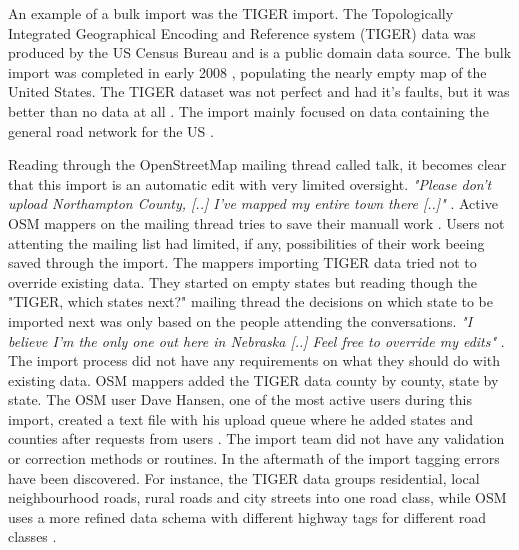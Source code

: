An example of a bulk import was the TIGER import. The Topologically Integrated Geographical Encoding and Reference system (TIGER) data was produced by the US Census Bureau and is a public domain data source. The bulk import was completed in early 2008 \cite{Zielstra2013}, populating the nearly empty map of the United States. The TIGER dataset was not perfect and had it's faults, but it was better than no data at all \cite{Willis2008}. The import mainly focused on data containing the general road network for the US \cite{Zielstra2013}. 

Reading through the OpenStreetMap mailing thread called talk, it becomes clear that this import is an automatic edit with very limited oversight. \textit{"Please don't upload Northampton County, [..] I've mapped my entire town there [..]"} \cite{Mielczarek2007}.  Active OSM mappers on the mailing thread tries to save their manuall work . Users not attenting the mailing list had limited, if any, possibilities of their work beeing saved through the import. The mappers importing TIGER data tried not to override existing data. They started on empty states but reading though the "TIGER, which states next?" mailing thread the decisions on which state to be imported next was only based on the people attending the conversations. \textit{"I believe I'm the only one out here in Nebraska [..] Feel free to override my edits"} \cite{Bishop2007}. The import process did not have any requirements on what they should do with existing data. OSM mappers added the TIGER data county by county, state by state. The OSM user Dave Hansen, one of the most active users during this import, created a text file with his upload queue \cite{Hansen2007a} where he added states and counties after requests from users \cite{Hansen2007}\cite{Hansen2007b}. The import team did not have any validation or correction methods or routines. In the aftermath of the import tagging errors have been discovered. For instance, the TIGER data groups residential, local neighbourhood roads, rural roads and city streets into one road class, while OSM uses a more refined data schema with different highway tags for different road classes \cite{Zielstra2013}.

